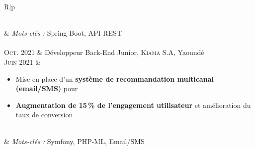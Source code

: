 \begin{longtable}{R{\leftcolumnlength}|p{\rightcolumnlength}}
{\begin{itemize}
		\end{itemize}
		\vspace{-1em}
	}\\&
 	\footnotesize{\emph{Mots-clés :} Spring Boot, API REST}\\
  \\
 	\textsc{Oct. 2021} & Développeur Back-End Junior, \textsc{Kiama S.A}, Yaoundé\\
 	\textsc{Juin 2021} &
 	\footnotesize{
 	 	\begin{itemize}
			\item Mise en place d'un \textbf{système de recommandation multicanal (email/SMS)} pour 
			\item \textbf{Augmentation de 15\,\% de l'engagement utilisateur} et amélioration du taux de conversion
		\end{itemize}
		\vspace{-1em}
	}\\&
 	\footnotesize{\emph{Mots-clés :} Symfony, PHP-ML, Email/SMS}\\
\end{longtable}
